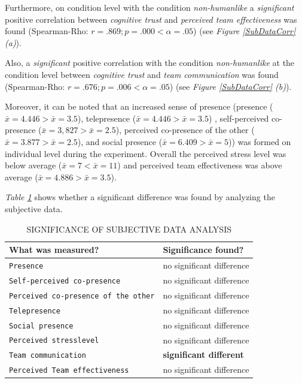 \documentclass[sigchi]{acmart}
\begin{document}
Furthermore, on condition level with the condition \textit{non-humanlike} a \textit{significant} positive correlation between \textit{cognitive trust} and \textit{perceived team effectiveness} was found (Spearman-Rho: $r =.869; p =.000 < \alpha = .05$) (see \textit{Figure \ref{SubDataCorr} (a)}).

Also, a \textit{significant} positive correlation with the condition \textit{non-humanlike} at the condition level between \textit{cognitive trust} and \textit{team communication} was found (Spearman-Rho: $r =.676; p =.006 < \alpha = .05$) (see \textit{Figure \ref{SubDataCorr} (b)}).

Moreover, it can be noted that an increased sense of presence (presence ($\bar{x} = 4.446 > \bar{x} = 3.5$), telepresence ($\bar{x} = 4.446 > \bar{x} = 3.5$) , self-perceived co-presence ($\bar{x} = 3, 827 > \bar{x} = 2.5$), perceived co-presence of the other ($\bar{x} = 3.877 > \bar{x} = 2.5$), and social presence ($\bar{x} = 6.409 > \bar{x} = 5$)) was formed on individual level during the experiment. Overall the perceived stress level was below average ($\bar{x} = 7 < \bar{x} = 11$) and perceived team effectiveness was above average ($\bar{x} = 4.886 > \bar{x} = 3.5$).

\textit{Table \ref{SubDataSigs}} shows whether a significant difference was found by analyzing the subjective data.

\begin{table}
	\caption{SIGNIFICANCE OF SUBJECTIVE DATA ANALYSIS}
  \label{SubDataSigs}
  \begin{tabular}{ll}
    \toprule
    What was measured? & Significance found? \\
    \midrule
     \texttt{Presence} & no significant difference \\
   	 \texttt{Self-perceived co-presence} & no significant difference \\
     \texttt{Perceived co-presence of the other} & no significant difference  \\
     \texttt{Telepresence} & no significant difference \\
     \texttt{Social presence} & no significant difference \\
     \texttt{Perceived stresslevel} & no significant difference \\
     \texttt{Team communication} & \textbf{significant different} \\
     \texttt{Perceived Team effectiveness} & no significant difference  \\
    \bottomrule
  \end{tabular}
\end{table}
\end{document}
